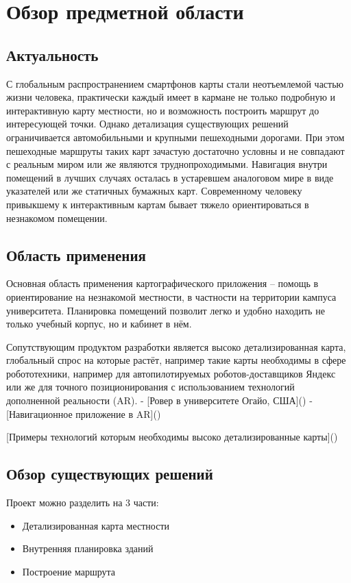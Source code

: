 \chapter{Обзор предметной области}
  \section{Актуальность}
    С глобальным распространением смартфонов карты стали неотъемлемой частью жизни человека, практически каждый имеет в кармане не только подробную и интерактивную карту местности, но и возможность построить маршрут до интересующей точки. Однако детализация существующих решений ограничивается автомобильными и крупными пешеходными дорогами. При этом пешеходные маршруты таких карт зачастую достаточно условны и не совпадают с реальным миром или же являются труднопроходимыми.
    Навигация внутри помещений в лучших случаях осталась в устаревшем аналоговом мире в виде указателей или же статичных бумажных карт. Современному человеку привыкшему к интерактивным картам бывает тяжело ориентироваться в незнакомом помещении.


  \section{Область применения}
    Основная область применения картографического приложения -- помощь в ориентирование на незнакомой местности, в частности на территории кампуса университета. Планировка помещений позволит легко и удобно находить не только учебный корпус, но и кабинет в нём.

    Сопутствующим продуктом разработки является высоко детализированная карта, глобальный спрос на которые растёт, например такие карты необходимы в сфере робототехники, например для автопилотируемых роботов-доставщиков Яндекс или же для точного позиционирования с использованием технологий дополненной реальности (AR).
    - [Ровер в университете Огайо, США]()
    - [Навигационное приложение в AR]()

    [Примеры технологий которым необходимы высоко детализированные карты]()

  \section{Обзор существующих решений}
    Проект можно разделить на 3 части:
    \begin{itemize}
      \item Детализированная карта местности
      \item Внутренняя планировка зданий
      \item Построение маршрута
    \end{itemize}



